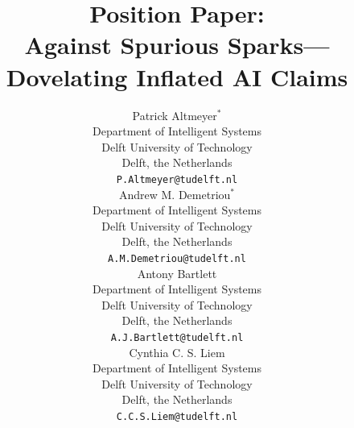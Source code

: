 \documentclass{article}
\theoremstyle{plain}
\theoremstyle{definition}
\theoremstyle{remark}
\begin{document}
\title{Position Paper:\\Against Spurious Sparks---Dovelating Inflated AI Claims }

\author{
    Patrick Altmeyer$^\ast$ \\
    Department of Intelligent Systems \\ 
    Delft University of Technology \\ 
    Delft, the Netherlands \\
	\texttt{P.Altmeyer@tudelft.nl} \\
	\And
    Andrew M. Demetriou$^\ast$ \\
    Department of Intelligent Systems \\ 
    Delft University of Technology \\ 
    Delft, the Netherlands \\
	\texttt{A.M.Demetriou@tudelft.nl} \\
	\And
    Antony Bartlett \\
    Department of Intelligent Systems \\ 
    Delft University of Technology \\ 
    Delft, the Netherlands \\
	\texttt{A.J.Bartlett@tudelft.nl} \\
	\And
    Cynthia C. S. Liem \\
    Department of Intelligent Systems \\ 
    Delft University of Technology \\ 
    Delft, the Netherlands \\
	\texttt{C.C.S.Liem@tudelft.nl} \\
}

\maketitle
\def\thefootnote{*}\def\thefootnote{\arabic{footnote}}
\end{document}
